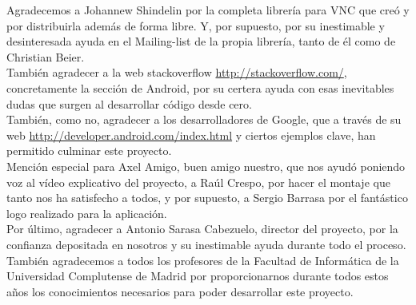 Agradecemos a Johannew Shindelin por la completa librer\'ia para VNC que cre\'o y por distribuirla adem\'as de forma libre. Y, por supuesto, por su inestimable y desinteresada ayuda en el Mailing-list de la propia librer\'ia, tanto de \'el como de Christian Beier.\\

Tambi\'en agradecer a la web stackoverflow \url{http://stackoverflow.com/}, concretamente la secci\'on de Android, por su certera ayuda con esas inevitables dudas que surgen al desarrollar c\'odigo desde cero.\\

Tambi\'en, como no, agradecer a los desarrolladores de Google, que a trav\'es de su web \url{http://developer.android.com/index.html} y ciertos ejemplos clave, han permitido culminar este proyecto.\\

Menci\'on especial para Axel Amigo, buen amigo nuestro, que nos ayud\'o poniendo voz al v\'ideo explicativo del proyecto, a Ra\'ul Crespo, por hacer el montaje que tanto nos ha satisfecho a todos, y por supuesto, a Sergio Barrasa por el fant\'astico logo realizado para la aplicaci\'on.\\

Por \'ultimo, agradecer a Antonio Sarasa Cabezuelo, director del proyecto, por la confianza depositada en nosotros y su inestimable ayuda durante todo el proceso. Tambi\'en agradecemos a todos los profesores de la Facultad de Inform\'atica de la Universidad Complutense de Madrid por proporcionarnos durante todos estos años los conocimientos necesarios para poder desarrollar este proyecto.